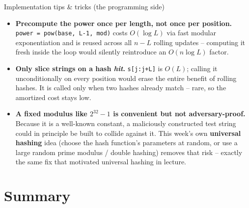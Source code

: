 \documentclass[11pt,aspectratio=169]{beamer}
\begin{document}
\begin{frame}{Implementation tips \& tricks (the programming side)}
  \small
  \begin{itemize}
    \item \textbf{Precompute the power once per length, not once per position.}
    \texttt{power = pow(base, L-1, mod)} costs $O(\log L)$ via fast modular
    exponentiation and is reused across all $n-L$ rolling updates -- computing it fresh
    inside the loop would silently reintroduce an $O(n\log L)$ factor.
    \item \textbf{Only slice strings on a hash \emph{hit}.} \texttt{s[j:j+L]} is
    $O(L)$; calling it unconditionally on every position would erase the entire benefit
    of rolling hashes. It is called only when two hashes already match -- rare, so the
    amortized cost stays low.
    \item \textbf{A fixed modulus like $2^{32}-1$ is convenient but not adversary-proof.}
    Because it is a well-known constant, a maliciously constructed test string could in
    principle be built to collide against it. This week's own \textbf{universal
    hashing} idea (choose the hash function's parameters at random, or use a large
    random prime modulus / double hashing) removes that risk -- exactly the same fix
    that motivated universal hashing in lecture.
  \end{itemize}
\end{frame}

\section{Summary}
\end{document}
